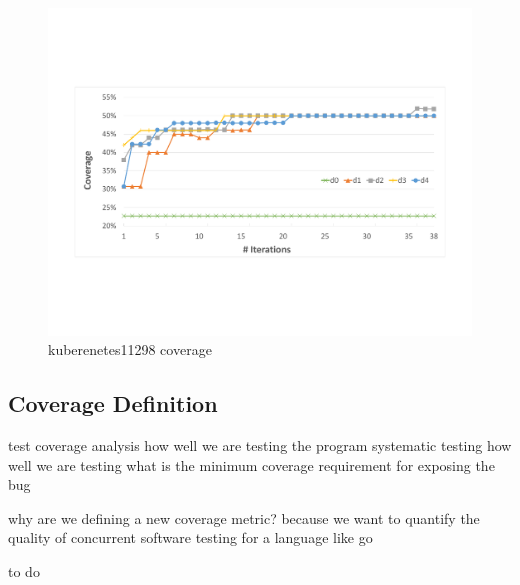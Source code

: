 \begin{figure}
\centering
  \includegraphics[width=.95\linewidth]{figs/coverage_kubernetes11298.pdf}
  \caption{kuberenetes11298 coverage}
  \label{fig:kubernetes_coverage}
\end{figure}











\subsection{Coverage Definition}
test coverage analysis
how well we are testing the program
systematic testing
how well we are testing
what is the minimum coverage requirement for exposing the bug

why are we defining a new coverage metric?
because we want to quantify the quality of concurrent software testing for a language like go

to do
